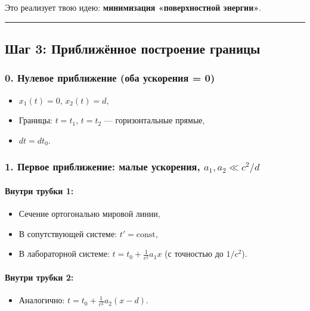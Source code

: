 \documentclass[11pt]{article}
\providecommand{\tightlist}{%
      \setlength{\itemsep}{0pt}\setlength{\parskip}{0pt}}
\begin{document}
Это реализует твою идею: \textbf{минимизация «поверхностной энергии»}.

\begin{center}\rule{0.5\linewidth}{\linethickness}\end{center}

\subsection{ Шаг 3: Приближённое построение границы}

\subsubsection{0. Нулевое приближение (оба ускорения = 0)}

\begin{itemize}
\tightlist
\item
  \(x_1(t) = 0\), \(x_2(t) = d\),
\item
  Границы: \(t = t_1\), \(t = t_2\) --- горизонтальные прямые,
\item
  \(dt = dt_0\).
\end{itemize}

\subsubsection{\texorpdfstring{1. Первое приближение: малые ускорения,
\(a_1, a_2 \ll c^2 / d\)}{1. Первое приближение: малые ускорения, a\_1, a\_2 \textbackslash{}ll c\^{}2 / d}}

\paragraph{Внутри трубки 1:}

\begin{itemize}
\tightlist
\item
  Сечение ортогонально мировой линии,
\item
  В сопутствующей системе: \(t' = \text{const}\),
\item
  В лабораторной системе: \(t = t_0 + \frac{1}{c^2} a_1 x\) (с точностью
  до \(1/c^2\)).
\end{itemize}

\paragraph{Внутри трубки 2:}

\begin{itemize}
\tightlist
\item
  Аналогично: \(t = t_0 + \frac{1}{c^2} a_2 (x - d)\).
\end{itemize}
\end{document}
